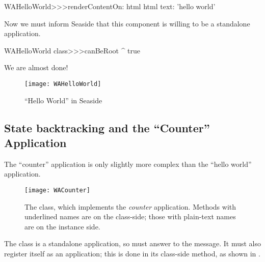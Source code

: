 \documentclass[a4paper,10pt,twoside]{book}
\begin{document}
\begin{code}{}
WAHelloWorld>>>renderContentOn: html
	html text: 'hello world'
\end{code}

\noindent
Now we must inform Seaside that this component is willing to be a standalone application.

\begin{code}{}
WAHelloWorld class>>>canBeRoot
	^ true
\end{code}

\noindent
We are almost done!


\begin{figure}[htb]
\begin{center}
\texttt{[image: WAHelloWorld]}
\caption{``Hello World'' in Seaside}
\end{center}
\end{figure}

\subsection{State backtracking and the ``Counter'' Application}

The ``counter'' application is only slightly more complex than the ``hello world''
application.

\begin{figure}[ht]
\begin{center}
\texttt{[image: WACounter]}
\caption{The  class, which implements the \emph{counter} application.
Methods with underlined names are on the class-side; those with plain-text names are on
the instance side.}
\end{center}
\end{figure}

The class  is a standalone application, so  must
answer  to the  message.
It must also register itself as an application; this is done in its class-side
 method, as shown in .
\end{document}
